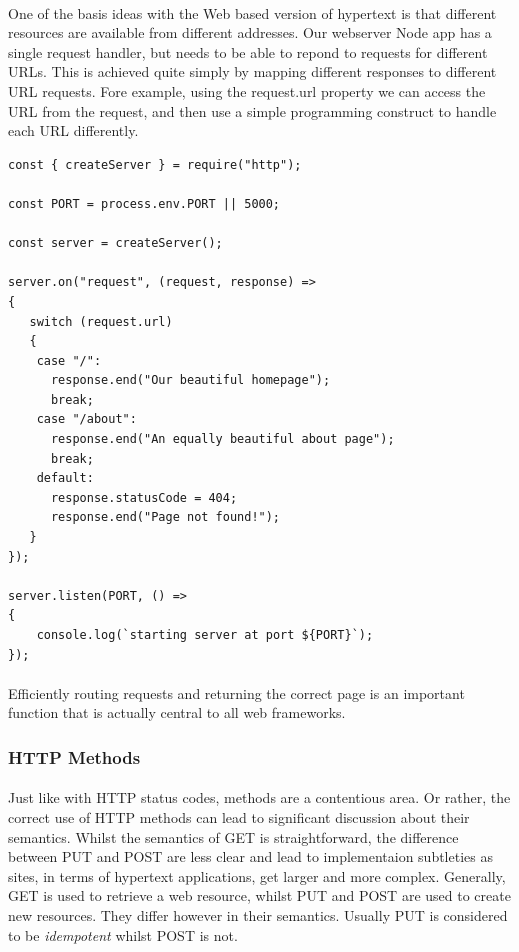 \documentclass[10pt, a4paper, twosize]{article}
\begin{document}
\paragraph{} One of the basis ideas with the Web based version of hypertext is that different resources are available from different addresses. Our webserver Node app has a single request handler, but needs to be able to repond to requests for different URLs. This is achieved quite simply by mapping different responses to different URL requests. Fore example, using the request.url property we can access the URL from the request, and then use a simple programming construct to handle each URL differently.

\begin{lstlisting}
const { createServer } = require("http");

const PORT = process.env.PORT || 5000;

const server = createServer();

server.on("request", (request, response) => 
{
   switch (request.url) 
   {
    case "/":
      response.end("Our beautiful homepage");
      break;
    case "/about":
      response.end("An equally beautiful about page");
      break;
    default:
      response.statusCode = 404;
      response.end("Page not found!");
   }
});

server.listen(PORT, () => 
{
    console.log(`starting server at port ${PORT}`);
});
\end{lstlisting}

\paragraph{} Efficiently routing requests and returning the correct page is an important function that is actually central to all web frameworks.



\subsubsection{HTTP Methods}
\paragraph{} Just like with HTTP status codes, methods are a contentious area. Or rather, the correct use of HTTP methods can lead to significant discussion about their semantics. Whilst the semantics of GET is straightforward, the difference between PUT and POST are less clear and lead to implementaion subtleties as sites, in terms of hypertext applications, get larger and more complex. Generally, GET is used to retrieve a web resource, whilst PUT and POST are used to create new resources. They differ however in their semantics. Usually PUT is considered to be \emph{idempotent} whilst POST is not.
\end{document}
